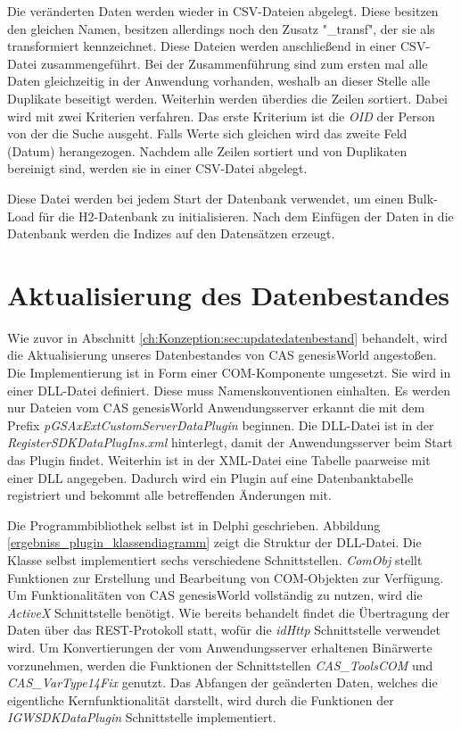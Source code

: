 Die veränderten Daten werden wieder in CSV-Dateien abgelegt. Diese besitzen den gleichen Namen, besitzen allerdings noch den Zusatz "\_transf", der sie als transformiert kennzeichnet. Diese Dateien werden anschließend in einer CSV-Datei zusammengeführt. Bei der Zusammenführung sind zum ersten mal alle Daten gleichzeitig in der Anwendung vorhanden, weshalb an dieser Stelle alle Duplikate beseitigt werden. Weiterhin werden überdies die Zeilen sortiert. Dabei wird mit zwei Kriterien verfahren. Das erste Kriterium ist die \textit{OID} der Person von der die Suche ausgeht. Falls Werte sich gleichen wird das zweite Feld (Datum) herangezogen. Nachdem alle Zeilen sortiert und von Duplikaten bereinigt sind, werden sie in einer CSV-Datei abgelegt. 

Diese Datei werden bei jedem Start der Datenbank verwendet, um einen Bulk-Load für die H2-Datenbank zu initialisieren. Nach dem Einfügen der Daten in die Datenbank werden die Indizes auf den Datensätzen erzeugt.


\section{Aktualisierung des Datenbestandes}

Wie zuvor in Abschnitt \ref{ch:Konzeption:sec:updatedatenbestand} behandelt, wird die Aktualisierung unseres Datenbestandes von CAS genesisWorld angestoßen. Die Implementierung ist in Form einer COM-Komponente umgesetzt. Sie wird in einer DLL-Datei definiert. Diese muss Namenskonventionen einhalten. Es werden nur Dateien vom CAS genesisWorld Anwendungsserver erkannt die mit dem Prefix \textit{pGSAxExtCustomServerDataPlugin} beginnen. Die DLL-Datei ist in der \textit{RegisterSDKDataPlugIns.xml} hinterlegt, damit der Anwendungsserver beim Start das Plugin findet. Weiterhin ist in der XML-Datei eine Tabelle paarweise mit einer DLL angegeben. Dadurch wird ein Plugin auf eine Datenbanktabelle registriert und bekommt alle betreffenden Änderungen mit.

Die Programmbibliothek selbst ist in Delphi geschrieben. Abbildung \ref{ergebniss_plugin_klassendiagramm} zeigt die Struktur der DLL-Datei. Die Klasse selbst implementiert sechs verschiedene Schnittstellen. \textit{ComObj} stellt Funktionen zur Erstellung und Bearbeitung von COM-Objekten zur Verfügung. Um Funktionalitäten von CAS genesisWorld vollständig zu nutzen, wird die \textit{ActiveX} Schnittstelle benötigt. Wie bereits behandelt findet die Übertragung der Daten über das REST-Protokoll statt, wofür die \textit{idHttp} Schnittstelle verwendet wird. Um Konvertierungen der vom Anwendungsserver erhaltenen Binärwerte vorzunehmen, werden die Funktionen der Schnittstellen \textit{CAS\_ToolsCOM} und \textit{CAS\_VarType14Fix} genutzt. Das Abfangen der geänderten Daten, welches die eigentliche Kernfunktionalität darstellt, wird durch die Funktionen der \textit{IGWSDKDataPlugin} Schnittstelle implementiert.

